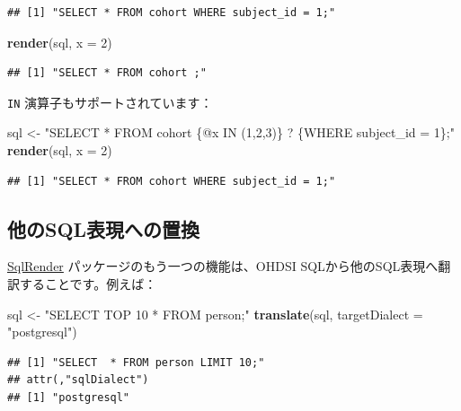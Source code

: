 \documentclass[
  11pt]{book}
\newenvironment{Shaded}{\begin{snugshade}}{\end{snugshade}}
\newcommand{\AttributeTok}[1]{\textcolor[rgb]{0.13,0.29,0.53}{#1}}
\newcommand{\DecValTok}[1]{\textcolor[rgb]{0.00,0.00,0.81}{#1}}
\newcommand{\FunctionTok}[1]{\textcolor[rgb]{0.13,0.29,0.53}{\textbf{#1}}}
\newcommand{\NormalTok}[1]{#1}
\newcommand{\OtherTok}[1]{\textcolor[rgb]{0.56,0.35,0.01}{#1}}
\newcommand{\StringTok}[1]{\textcolor[rgb]{0.31,0.60,0.02}{#1}}
\theoremstyle{definition}
\theoremstyle{definition}
\theoremstyle{definition}
\theoremstyle{definition}
\theoremstyle{remark}
\begin{document}
\begin{verbatim}
## [1] "SELECT * FROM cohort WHERE subject_id = 1;"
\end{verbatim}

\begin{Shaded}
\begin{Highlighting}[]
\FunctionTok{render}\NormalTok{(sql, }\AttributeTok{x =} \DecValTok{2}\NormalTok{)}
\end{Highlighting}
\end{Shaded}

\begin{verbatim}
## [1] "SELECT * FROM cohort ;"
\end{verbatim}

\texttt{IN} 演算子もサポートされています：

\begin{Shaded}
\begin{Highlighting}[]
\NormalTok{sql }\OtherTok{\textless{}{-}} \StringTok{"SELECT * FROM cohort \{@x IN (1,2,3)\} ? \{WHERE subject\_id = 1\};"}
\FunctionTok{render}\NormalTok{(sql, }\AttributeTok{x =} \DecValTok{2}\NormalTok{)}
\end{Highlighting}
\end{Shaded}

\begin{verbatim}
## [1] "SELECT * FROM cohort WHERE subject_id = 1;"
\end{verbatim}

\subsection{他のSQL表現への置換}\label{ux4ed6ux306esqlux8868ux73feux3078ux306eux7f6eux63db}

\href{https://ohdsi.github.io/SqlRender/}{SqlRender} パッケージのもう一つの機能は、OHDSI SQLから他のSQL表現へ翻訳することです。例えば：

\begin{Shaded}
\begin{Highlighting}[]
\NormalTok{sql }\OtherTok{\textless{}{-}} \StringTok{"SELECT TOP 10 * FROM person;"}
\FunctionTok{translate}\NormalTok{(sql, }\AttributeTok{targetDialect =} \StringTok{"postgresql"}\NormalTok{)}
\end{Highlighting}
\end{Shaded}

\begin{verbatim}
## [1] "SELECT  * FROM person LIMIT 10;"
## attr(,"sqlDialect")
## [1] "postgresql"
\end{verbatim}
\end{document}
